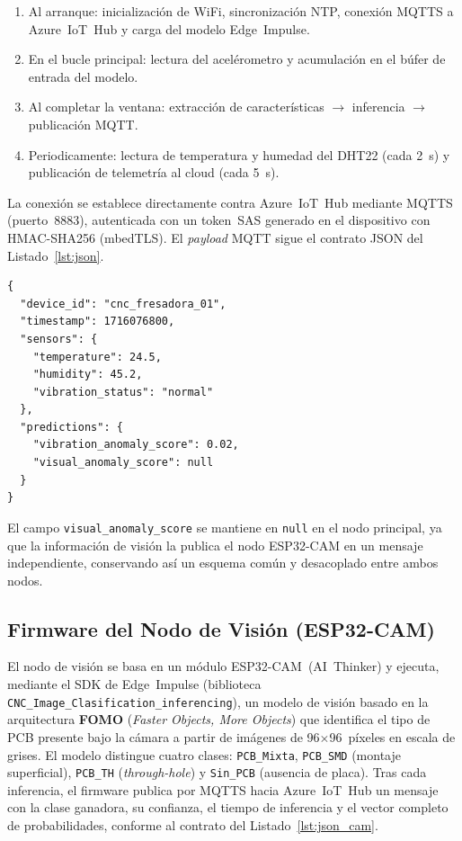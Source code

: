 \documentclass[journal,transmag]{IEEEtran}
\begin{document}
\begin{enumerate}
  \item Al arranque: inicializaci\'on de WiFi, sincronizaci\'on NTP,
        conexi\'on MQTTS a Azure~IoT~Hub y carga del modelo Edge~Impulse.
  \item En el bucle principal: lectura del acel\'erometro y
        acumulaci\'on en el b\'ufer de entrada del modelo.
  \item Al completar la ventana: extracci\'on de caracter\'isticas
        $\rightarrow$ inferencia $\rightarrow$ publicaci\'on MQTT.
  \item Periodicamente: lectura de temperatura y humedad del DHT22 (cada 2~s)
        y publicaci\'on de telemetr\'ia al cloud (cada 5~s).
\end{enumerate}

La conexi\'on se establece directamente contra Azure~IoT~Hub mediante MQTTS
(puerto~8883), autenticada con un token~SAS generado en el dispositivo con
HMAC-SHA256 (mbedTLS). El \textit{payload} MQTT sigue el contrato JSON del
Listado~\ref{lst:json}.

\begin{lstlisting}[caption={Contrato JSON del payload MQTT.},label={lst:json}]
{
  "device_id": "cnc_fresadora_01",
  "timestamp": 1716076800,
  "sensors": {
    "temperature": 24.5,
    "humidity": 45.2,
    "vibration_status": "normal"
  },
  "predictions": {
    "vibration_anomaly_score": 0.02,
    "visual_anomaly_score": null
  }
}
\end{lstlisting}

El campo \texttt{visual\_anomaly\_score} se mantiene en \texttt{null} en el nodo principal, ya que la informaci\'on de visi\'on la publica el nodo ESP32-CAM en un mensaje independiente, conservando as\'i un esquema com\'un y desacoplado entre ambos nodos.

\subsection{Firmware del Nodo de Visi\'on (ESP32-CAM)}

El nodo de visi\'on se basa en un m\'odulo ESP32-CAM~(AI~Thinker) y ejecuta, mediante el SDK de Edge~Impulse (biblioteca \texttt{CNC\_Image\_Clasification\_inferencing}), un modelo de visi\'on basado en la arquitectura \textbf{FOMO} (\textit{Faster Objects, More Objects}) que identifica el tipo de PCB presente bajo la c\'amara a partir de im\'agenes de 96$\times$96~p\'ixeles en escala de grises. El modelo distingue cuatro clases: \texttt{PCB\_Mixta}, \texttt{PCB\_SMD} (montaje superficial), \texttt{PCB\_TH} (\textit{through-hole}) y \texttt{Sin\_PCB} (ausencia de placa). Tras cada inferencia, el firmware publica por MQTTS hacia Azure~IoT~Hub un mensaje con la clase ganadora, su confianza, el tiempo de inferencia y el vector completo de probabilidades, conforme al contrato del Listado~\ref{lst:json_cam}.
\end{document}
